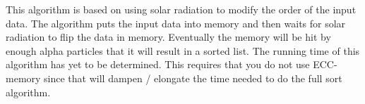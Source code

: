 \documentclass[9pt]{extarticle} %
\begin{document}
\begin{minipage}[t]{.61\linewidth}
This algorithm is based on using solar radiation to modify the order of the input data. The
algorithm puts the input data into memory and then waits for solar radiation to flip the data in
memory. Eventually the memory will be hit by enough alpha particles that it will result in a sorted
list. The running time of this algorithm has yet to be determined. This requires that you do not use
ECC-memory since that will dampen / elongate the time needed to do the full sort algorithm.


\end{minipage} %
\end{document}
